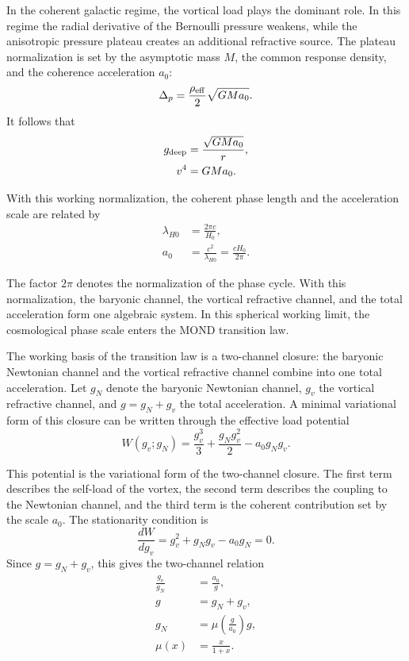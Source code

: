 \documentclass[12pt]{article}
\begin{document}
In the coherent galactic regime, the vortical load plays the dominant role. In this regime the radial derivative of the Bernoulli pressure weakens, while the anisotropic pressure plateau creates an additional refractive source. The plateau normalization is set by the asymptotic mass $M$, the common response density, and the coherence acceleration $a_0$:
\begin{equation}
\Delta_p=\frac{\rho_{\rm eff}}{2}\sqrt{GMa_0}.
\end{equation}
It follows that
\begin{align}
g_{\rm deep} &= \frac{\sqrt{GMa_0}}{r}, \\
v^4 &= GMa_0 .
\end{align}

With this working normalization, the coherent phase length and the acceleration scale are related by
\begin{align}
\lambda_{H0} &= \frac{2\pi c}{H_0}, \\
a_0 &= \frac{c^2}{\lambda_{H0}}
     = \frac{cH_0}{2\pi}.
\end{align}

The factor $2\pi$ denotes the normalization of the phase cycle. With this normalization, the baryonic channel, the vortical refractive channel, and the total acceleration form one algebraic system. In this spherical working limit, the cosmological phase scale enters the MOND transition law.

The working basis of the transition law is a two-channel closure: the baryonic Newtonian channel and the vortical refractive channel combine into one total acceleration. Let $g_N$ denote the baryonic Newtonian channel, $g_v$ the vortical refractive channel, and $g=g_N+g_v$ the total acceleration. A minimal variational form of this closure can be written through the effective load potential
\begin{equation}
W(g_v;g_N)=\frac{g_v^3}{3}+\frac{g_Ng_v^2}{2}-a_0g_Ng_v .
\end{equation}

This potential is the variational form of the two-channel closure. The first term describes the self-load of the vortex, the second term describes the coupling to the Newtonian channel, and the third term is the coherent contribution set by the scale $a_0$. The stationarity condition is
\begin{equation}
\frac{dW}{dg_v}=g_v^2+g_Ng_v-a_0g_N=0 .
\end{equation}
Since $g=g_N+g_v$, this gives the two-channel relation
\begin{align}
\frac{g_v}{g_N} &= \frac{a_0}{g}, \\
g &= g_N+g_v, \\
g_N &= \mu\!\left(\frac{g}{a_0}\right)g, \\
\mu(x) &= \frac{x}{1+x}.
\end{align}
\end{document}
